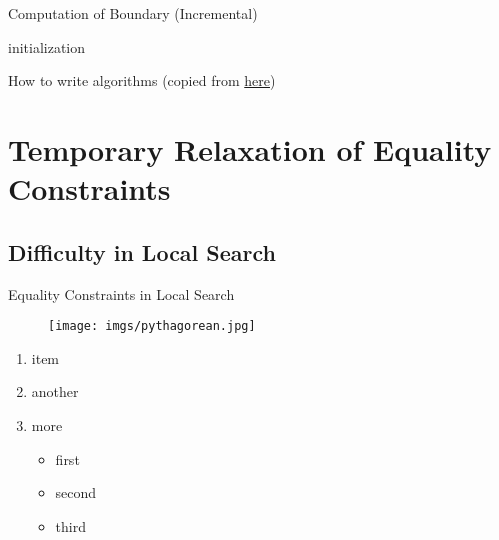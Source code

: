 \begin{frame}{Computation of Boundary (Incremental)}
    \scriptsize
    \begin{algorithm}[H]
        initialization\;
        \caption{How to write algorithms
        (copied from \href{https://en.wikibooks.org/wiki/LaTeX/Algorithms}{here})}
        \end{algorithm}
\end{frame}

\section{Temporary Relaxation of Equality Constraints}

\subsection{Difficulty in Local Search}

\begin{frame}{Equality Constraints in Local Search}
    \begin{minipage}{0.5\linewidth}
        \begin{figure}[h]
            \texttt{[image: imgs/pythagorean.jpg]}
        \end{figure}
    \end{minipage}%
    \hfill
    \begin{minipage}{0.4\linewidth}
        \begin{enumerate}
            \item item
            \item another
            \item more
            \begin{itemize}
                \item first
                \item second
                \item third
            \end{itemize}
        \end{enumerate}
    \end{minipage}
\end{frame}

